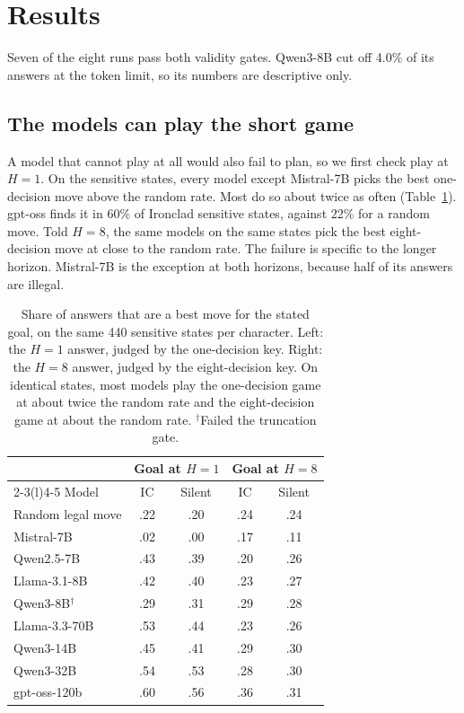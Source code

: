 \section{Results}
\label{sec:results}

Seven of the eight runs pass both validity gates. Qwen3-8B cut off 4.0\% of its answers at the token limit, so its numbers are descriptive only.

\subsection{The models can play the short game}

A model that cannot play at all would also fail to plan, so we first check play at $H{=}1$. On the sensitive states, every model except Mistral-7B picks the best one-decision move above the random rate. Most do so about twice as often (Table~\ref{tab:competence}). gpt-oss finds it in 60\% of Ironclad sensitive states, against 22\% for a random move. Told $H{=}8$, the same models on the same states pick the best eight-decision move at close to the random rate. The failure is specific to the longer horizon. Mistral-7B is the exception at both horizons, because half of its answers are illegal.

\begin{table}[t]
\centering
\footnotesize
\setlength{\tabcolsep}{4pt}
\begin{tabular}{@{}lcccc@{}}
\toprule
& \multicolumn{2}{c}{Goal at $H{=}1$} & \multicolumn{2}{c}{Goal at $H{=}8$} \\
\cmidrule(lr){2-3}\cmidrule(l){4-5}
Model & IC & Silent & IC & Silent \\
\midrule
\textcolor{muted}{Random legal move} & \textcolor{muted}{.22} & \textcolor{muted}{.20} & \textcolor{muted}{.24} & \textcolor{muted}{.24} \\
\midrule
Mistral-7B & .02 & .00 & .17 & .11 \\
Qwen2.5-7B & .43 & .39 & .20 & .26 \\
Llama-3.1-8B & .42 & .40 & .23 & .27 \\
Qwen3-8B$^\dagger$ & .29 & .31 & .29 & .28 \\
Llama-3.3-70B & .53 & .44 & .23 & .26 \\
Qwen3-14B & .45 & .41 & .29 & .30 \\
\rowcolor{tier} Qwen3-32B & .54 & .53 & .28 & .30 \\
\rowcolor{tier} gpt-oss-120b & .60 & .56 & .36 & .31 \\
\bottomrule
\end{tabular}
\caption{Share of answers that are a best move for the stated goal, on the same 440 sensitive states per character. Left: the $H{=}1$ answer, judged by the one-decision key. Right: the $H{=}8$ answer, judged by the eight-decision key. On identical states, most models play the one-decision game at about twice the random rate and the eight-decision game at about the random rate. $^\dagger$Failed the truncation gate.}
\label{tab:competence}
\end{table}

